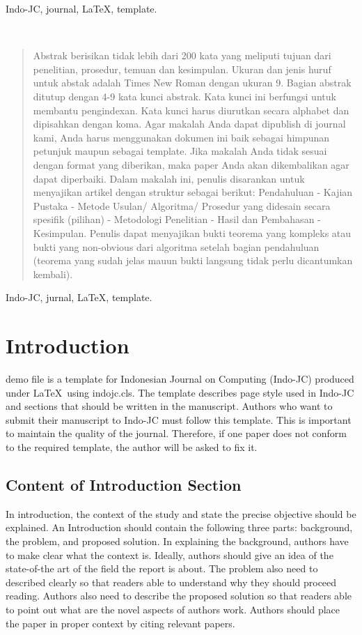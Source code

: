\documentclass[]{indojc}
\begin{document}
\begin{keywords}
Indo-JC, journal, \LaTeX, template.
\end{keywords}
$~$\\
\def\abstractname{Abstrak}
\def\keywordsname{Kata Kunci}
\begin{abstract}
Abstrak berisikan tidak lebih dari 200 kata yang meliputi tujuan dari penelitian, prosedur, temuan dan kesimpulan. Ukuran dan jenis huruf untuk abstak adalah Times New Roman dengan ukuran 9. Bagian abstrak ditutup dengan 4-9 kata kunci abstrak. Kata kunci ini berfungsi untuk membantu pengindexan. Kata kunci harus diurutkan secara alphabet dan dipisahkan dengan koma. Agar makalah Anda dapat dipublish di journal kami, Anda harus menggunakan dokumen ini baik sebagai himpunan petunjuk maupun sebagai template. Jika makalah Anda tidak sesuai dengan format yang diberikan, maka paper Anda akan dikembalikan agar dapat diperbaiki. Dalam makalah ini, penulis disarankan untuk menyajikan artikel dengan struktur sebagai berikut: Pendahuluan - Kajian Pustaka  - Metode Usulan/ Algoritma/ Prosedur yang didesain secara spesifik (pilihan) - Metodologi Penelitian - Hasil dan Pembahasan - Kesimpulan. Penulis dapat menyajikan bukti teorema yang kompleks atau bukti yang non-obvious dari algoritma setelah bagian pendahuluan (teorema yang sudah jelas mauun bukti langsung tidak perlu dicantumkan kembali).
\end{abstract}

\begin{keywords}
Indo-JC, jurnal, \LaTeX, template.
\end{keywords}


\section{Introduction}
 demo file is a template for Indonesian Journal on Computing (Indo-JC) produced under \LaTeX\ using indojc.cls. The template describes page style used in Indo-JC and sections that should be written in the manuscript. Authors who want to submit their manuscript to Indo-JC must follow this template. This is important to maintain the quality of the journal. Therefore, if one paper does not conform to the required template, the author will be asked to fix it.

\subsection{Content of Introduction Section}
In introduction, the context of the study and state the precise objective should be explained. An Introduction should contain the following three parts: background, the problem, and proposed solution. In explaining the background, authors have to make clear what the context is. Ideally, authors should give an idea of the state-of-the art of the field the report is about. The problem also need to described clearly so that readers able to understand why they should proceed reading. Authors also need to describe the proposed solution so that readers able to point out what are the novel aspects of authors work. Authors should place the paper in proper context by citing relevant papers. 
\end{document}

